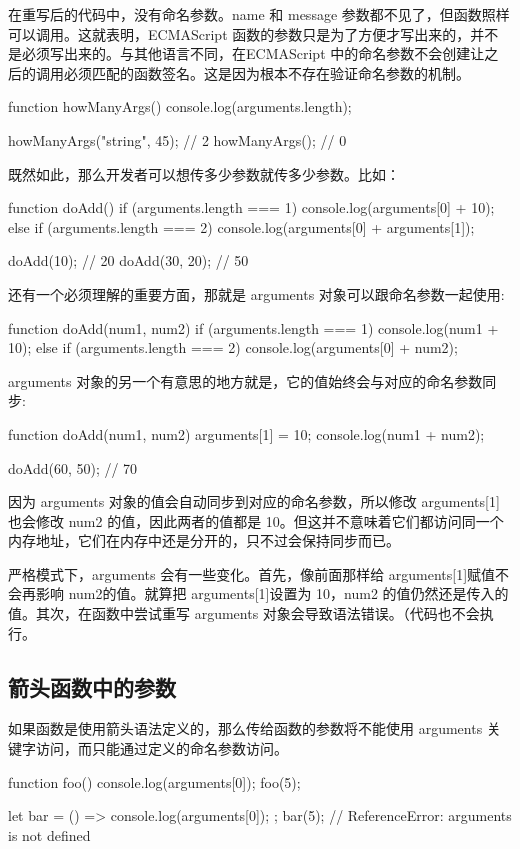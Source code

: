 在重写后的代码中，没有命名参数。name 和 message 参数都不见了，但函数照样可以调用。这就表明，ECMAScript 函数的参数只是为了方便才写出来的，并不是必须写出来的。与其他语言不同，在ECMAScript 中的命名参数不会创建让之后的调用必须匹配的函数签名。这是因为根本不存在验证命名参数的机制。

\begin{js}
function howManyArgs() {
  console.log(arguments.length);
}

howManyArgs("string", 45); // 2
howManyArgs(); // 0
\end{js}
既然如此，那么开发者可以想传多少参数就传多少参数。比如：
\begin{js}
function doAdd() {
  if (arguments.length === 1) {
    console.log(arguments[0] + 10);
  } else if (arguments.length === 2) {
    console.log(arguments[0] + arguments[1]);
  }
}

doAdd(10); // 20
doAdd(30, 20); // 50
\end{js}

还有一个必须理解的重要方面，那就是 arguments 对象可以跟命名参数一起使用:

\begin{js}
function doAdd(num1, num2) {
  if (arguments.length === 1) {
    console.log(num1 + 10);
  } else if (arguments.length === 2) {
    console.log(arguments[0] + num2);
  }
}
\end{js}

arguments 对象的另一个有意思的地方就是，它的值始终会与对应的命名参数同步:
\begin{js}
function doAdd(num1, num2) {
  arguments[1] = 10;
  console.log(num1 + num2);
}

doAdd(60, 50); // 70
\end{js}
因为 arguments 对象的值会自动同步到对应的命名参数，所以修改 arguments[1]也会修改 num2 的值，因此两者的值都是 10。但这并不意味着它们都访问同一个内存地址，它们在内存中还是分开的，只不过会保持同步而已。

严格模式下，arguments 会有一些变化。首先，像前面那样给 arguments[1]赋值不会再影响 num2的值。就算把 arguments[1]设置为 10，num2 的值仍然还是传入的值。其次，在函数中尝试重写 arguments 对象会导致语法错误。（代码也不会执行。

\subsection{箭头函数中的参数}
如果函数是使用箭头语法定义的，那么传给函数的参数将不能使用 arguments 关键字访问，而只能通过定义的命名参数访问。
\begin{js}
function foo() {
  console.log(arguments[0]);
}
foo(5);

let bar = () => {
  console.log(arguments[0]);
};
bar(5); // ReferenceError: arguments is not defined
\end{js}

